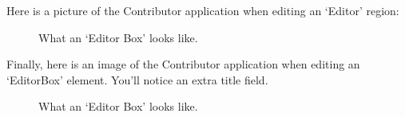 \clearpage

Here is a picture of the Contributor application when editing an
`Editor' region:

\begin{figure}[h!]
  \centering
  \caption{What an `Editor Box' looks like.}
\end{figure}

\clearpage

Finally, here is an image of the Contributor application when editing
an `EditorBox' element.  You'll notice an extra title field.

\begin{figure}[h!]
  \centering
  \caption{What an `Editor Box' looks like.}
\end{figure}


